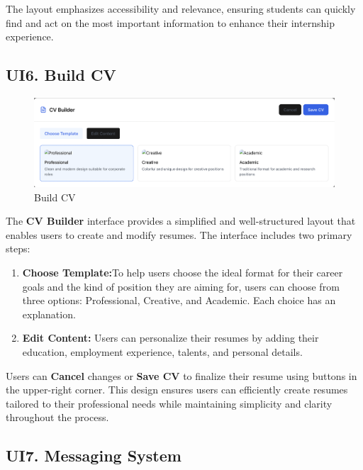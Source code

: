 The layout emphasizes accessibility and relevance, ensuring students can quickly find and act on the most important information to enhance their internship experience.

\subsection{UI6. Build CV}
\label{subsec:build_cv_ui}%

\begin{figure}[H]
    \begin{center}
        \includegraphics[width=0.82\linewidth]{JhaBhatiaSharma/imagesDD/BuildCV.png}
        \caption{Build CV}
        \label{fig:BuildCV}
    \end{center}
\end{figure}

The \textbf{CV Builder} interface provides a simplified and well-structured layout that enables users to create and modify resumes. The interface includes two primary steps:
\begin{enumerate}
    \item \textbf{Choose Template:}To help users choose the ideal format for their career goals and the kind of position they are aiming for, users can choose from three options: Professional, Creative, and Academic. Each choice has an explanation.
    \item \textbf{Edit Content:} Users can personalize their resumes by adding their education, employment experience, talents, and personal details.
\end{enumerate}

Users can \textbf{Cancel} changes or \textbf{Save CV} to finalize their resume using buttons in the upper-right corner. This design ensures users can efficiently create resumes tailored to their professional needs while maintaining simplicity and clarity throughout the process.

\subsection{UI7. Messaging System}
\label{subsec:messaging_system_ui}%


